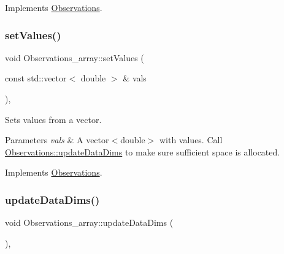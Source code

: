 Implements \mbox{\hyperlink{class_observations_a6ec8166ad0f141e23a07847ab3646a61}{Observations}}.

\mbox{\label{class_observations__array_ae4ed49512506eae597a158d4c87dbd31}} 
\subsubsection{\texorpdfstring{set\+Values()}{setValues()}}
{\footnotesize\ttfamily void Observations\+\_\+array\+::set\+Values (\begin{DoxyParamCaption}\item[{const std\+::vector$<$ double $>$ \&}]{vals }\end{DoxyParamCaption})\hspace{0.3cm}{\ttfamily [override]}, {\ttfamily [virtual]}}

Sets values from a vector.


\begin{DoxyParams}{Parameters}
{\em vals} & A vector$<$double$>$ with values. Call \mbox{\hyperlink{class_observations_aab0540879c2d3fdf5f91d30ea2f902fd}{Observations\+::update\+Data\+Dims}} to make sure sufficient space is allocated. \\
\hline
\end{DoxyParams}


Implements \mbox{\hyperlink{class_observations_a3aaf49cad714ff61c105d26b4b083ac3}{Observations}}.

\mbox{\label{class_observations__array_aa9364c4356d1f8a2b430c93a1fcd021f}} 
\subsubsection{\texorpdfstring{update\+Data\+Dims()}{updateDataDims()}}
{\footnotesize\ttfamily void Observations\+\_\+array\+::update\+Data\+Dims (\begin{DoxyParamCaption}{ }\end{DoxyParamCaption})\hspace{0.3cm}{\ttfamily [override]}, {\ttfamily [virtual]}}

